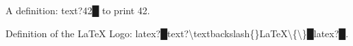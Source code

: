 
A definition: {\mktsStyleBold\color{violet}{\mktsStyleSymbol}text?42{\mktsStyleSymbol█}} to print {\mktsStyleCode{}42}.\mktsShowpar\par
Definition of the LaTeX Logo:
{\mktsStyleBold\color{violet}{\mktsStyleSymbol}latex?{\mktsStyleSymbol█}}{\mktsStyleBold\color{violet}{\mktsStyleSymbol}text?\textbackslash{}textbackslash\{\}LaTeX\textbackslash{}\{\textbackslash{}\}{\mktsStyleSymbol█}}{\mktsStyleBold\color{violet}{\mktsStyleSymbol}latex?{\mktsStyleSymbol█}}.\mktsShowpar\par

